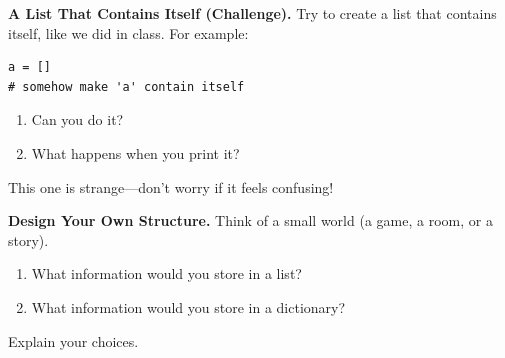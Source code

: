 \begin{exercises}
\item \textcolor{TermSage}{\bfseries\sffamily A List That Contains Itself (Challenge).}
Try to create a list that contains itself, like we did in class. For example:
\begin{lstlisting}
a = []
# somehow make 'a' contain itself
\end{lstlisting}
\begin{enumerate}
  \item Can you do it?
  \item What happens when you print it?
\end{enumerate}
This one is strange---don’t worry if it feels confusing!

\item \textcolor{TermSage}{\bfseries\sffamily Design Your Own Structure.}
Think of a small world (a game, a room, or a story).
\begin{enumerate}
  \item What information would you store in a list?
  \item What information would you store in a dictionary?
\end{enumerate}
Explain your choices.

\end{exercises}

